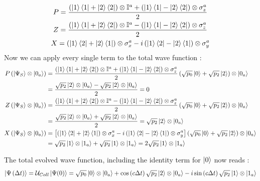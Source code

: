 \documentclass[a4paper,12pt]{article}
\begin{document}
	\begin{gather}
		P = \frac{\left( \ket{1}\bra{1} + \ket{2}\bra{2} \right) \otimes \mathbb{I}^{a} + \left( \ket{1}\bra{1} - \ket{2}\bra{2} \right) \otimes \sigma_{z}^{a} }{2} \\
		Z = \frac{\left( \ket{1}\bra{1} + \ket{2}\bra{2} \right) \otimes \mathbb{I}^{a} - \left( \ket{1}\bra{1} - \ket{2}\bra{2} \right) \otimes \sigma_{z}^{a} }{2} \\
		X = \left( \ket{1}\bra{2} + \ket{2}\bra{1} \right) \otimes \sigma_{x}^{a} - i \left( \ket{1}\bra{2} - \ket{2}\bra{1} \right) \otimes \sigma_{y}^{a}
	\end{gather}
	Now we can apply every single term to the total wave function : 
	\begin{align}
		P \left( \ket{\Psi_{S}} \otimes \ket{0_{a}} \right) &= \frac{\left( \ket{1}\bra{1} + \ket{2}\bra{2} \right) \otimes \mathbb{I}^{a} + \left( \ket{1}\bra{1} - \ket{2}\bra{2} \right) \otimes \sigma_{z}^{a} }{2} \left( \sqrt{p_{0}} \ket{0} + \sqrt{p_{2}} \ket{2} \right) \otimes \ket{0_{a}}  \notag \\
		&= \frac{ \sqrt{p_{2}} \ket{2} \otimes \ket{0_{a}} - \sqrt{p_{2}} \ket{2} \otimes \ket{0_{a}} }{2} = 0 \\
		Z \left( \ket{\Psi_{S}} \otimes \ket{0_{a}} \right) &= \frac{\left( \ket{1}\bra{1} + \ket{2}\bra{2} \right) \otimes \mathbb{I}^{a} - \left( \ket{1}\bra{1} - \ket{2}\bra{2} \right) \otimes \sigma_{z}^{a} }{2} \left( \sqrt{p_{0}} \ket{0} + \sqrt{p_{2}} \ket{2} \right) \otimes \ket{0_{a}}  \notag \\
		&= \frac{ \sqrt{p_{2}} \ket{2} \otimes \ket{0_{a}} + \sqrt{p_{2}} \ket{2} \otimes \ket{0_{a}} }{2} = \sqrt{p_{2}} \ket{2} \otimes \ket{0_{a}} \\
		X \left( \ket{\Psi_{S}} \otimes \ket{0_{a}} \right) &= \left[\left( \ket{1}\bra{2} + \ket{2}\bra{1} \right) \otimes \sigma_{x}^{a} - i \left( \ket{1}\bra{2} - \ket{2}\bra{1} \right) \otimes \sigma_{y}^{a}\right] \left( \sqrt{p_{0}} \ket{0} + \sqrt{p_{2}} \ket{2} \right) \otimes \ket{0_{a}}  \notag \\
		&= \sqrt{p_{2}} \ket{1} \otimes \ket{1_{a}} + \sqrt{p_{2}} \ket{1} \otimes \ket{1_{a}} = 2 \sqrt{p_{2}} \ket{1} \otimes \ket{1_{a}} 
	\end{align}
	
	\newpage
	
	The total evolved wave function, including the identity term for $ \ket{0} $ now reads : 
	\begin{equation}
		\ket{\Psi \left( \Delta t \right)} = \mathcal{U}_{Coll} \ket{\Psi (0)} = \sqrt{p_{0}} \ket{0} \otimes \ket{0_{a}} + \cos \left( c \Delta t \right) \sqrt{p_{2}} \ket{2} \otimes \ket{0_{a}} - i \sin \left( c \Delta t \right) \sqrt{p_{2}}  \ket{1} \otimes \ket{1_{a}}
	\end{equation}
	
\end{document}
